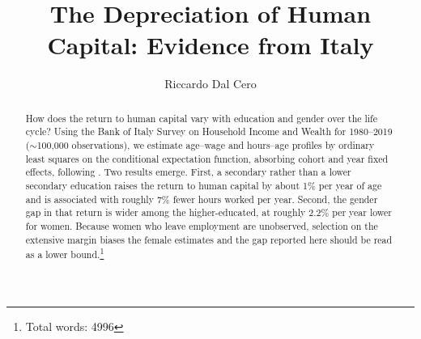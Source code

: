 \documentclass[12pt]{article}
\title{The Depreciation of Human Capital: Evidence from Italy}
\author{ Riccardo Dal Cero }
\begin{document}
\maketitle
\begin{abstract}

How does the return to human capital vary with education and gender over the life cycle? Using the Bank of Italy Survey
on Household Income and Wealth for 1980--2019 ($\sim$100,000 observations), we estimate age--wage and hours--age profiles
by ordinary least squares on the conditional expectation function, absorbing cohort and year fixed effects, following
\citet{hendricks2013ben}. Two results emerge. First, a secondary rather than a lower secondary education raises the
return to human capital by about 1\% per year of age and is associated with roughly 7\% fewer hours worked per year.
Second, the gender
gap in that return is wider among the higher-educated, at roughly 2.2\% per year lower for women. Because women who
leave employment are unobserved, selection on the extensive margin biases the female estimates and the gap reported here
should be read as a lower bound.\footnote{Total words: 4996}
\end{abstract}

\newpage
\end{document}
